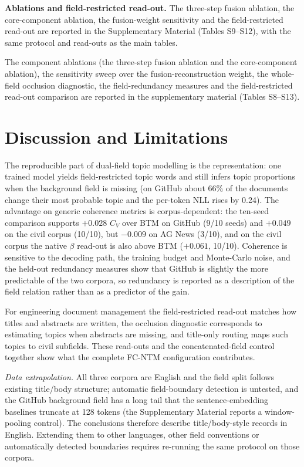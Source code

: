 \documentclass[Journal,letterpaper,NoLists]{ascelike-new}
\begin{document}
\noindent\textbf{Ablations and field-restricted read-out.} The three-step fusion
ablation, the core-component ablation, the fusion-weight sensitivity and the field-restricted
read-out are reported in the Supplementary Material (Tables S9--S12), with the same protocol and
read-outs as the main tables.

The component ablations (the three-step fusion ablation and the
core-component ablation), the sensitivity sweep over the fusion-reconstruction weight, the
whole-field occlusion diagnostic, the field-redundancy measures and the field-restricted read-out
comparison are reported in the supplementary material (Tables S8--S13).

\section{Discussion and Limitations}

The reproducible part of dual-field topic modelling is the representation: one trained model
yields field-restricted topic words and still infers topic proportions when the background field is
missing (on GitHub about 66\% of the documents change their most probable topic and the per-token
NLL rises by 0.24). The advantage on generic coherence metrics is corpus-dependent: the ten-seed
comparison supports $+0.028$ $C_V$ over BTM on GitHub (9/10 seeds) and $+0.049$ on the civil corpus
(10/10), but $-0.009$ on AG News (3/10), and on the civil corpus the native $\beta$ read-out is also
above BTM ($+0.061$, 10/10). Coherence is sensitive to the decoding path, the training budget and
Monte-Carlo noise, and the held-out redundancy measures show that GitHub is slightly the more
predictable of the two corpora, so redundancy is reported as a description of the field relation
rather than as a predictor of the gain.

For engineering document management the field-restricted read-out matches how titles and
abstracts are written, the occlusion diagnostic corresponds to estimating topics when abstracts are
missing, and title-only routing maps such topics to civil subfields. These read-outs and the
concatenated-field control together show what the complete FC-NTM configuration contributes.

\emph{Data extrapolation.} All three corpora are English and the field split follows existing
title/body structure; automatic field-boundary detection is untested, and the GitHub background field
has a long tail that the sentence-embedding baselines truncate at 128 tokens (the Supplementary Material
reports a window-pooling control). The conclusions therefore describe title/body-style records in
English. Extending them to other languages, other field conventions or automatically detected
boundaries requires re-running the same protocol on those corpora.
\end{document}
